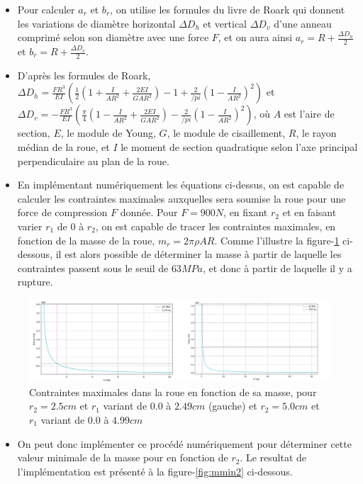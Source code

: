 \begin{itemize}
\begin{itemize}
    \item Pour calculer $a_r$ et $b_r$, on utilise les formules du livre de Roark qui donnent les variations de diamètre horizontal $\Delta D_h$ et vertical $\Delta D_v$ d'une anneau comprimé selon son diamètre avec une force $F$, et on aura ainsi $a_r=R+\frac{\Delta D_h}{2}$ et $b_r=R+\frac{\Delta D_v}{2}$.
    \item D'après les formules de Roark, $\Delta D_h=\frac{FR^3}{EI}(\frac{1}{2}(1+\frac{I}{AR^2}+\frac{2EI}{GAR^2})-1+\frac{2}{/pi}(1-\frac{I}{AR^2})^2)$ et $\Delta D_v=-\frac{FR^3}{EI}(\frac{\pi}{4}(1-\frac{I}{AR^2}+\frac{2EI}{GAR^2})-\frac{2}{/pi}(1-\frac{I}{AR^2})^2)$, où $A$ est l'aire de section, $E$, le module de Young, $G$, le module de cisaillement, $R$, le rayon médian de la roue, et $I$ le moment de section quadratique selon l'axe principal perpendiculaire au plan de la roue.
    \item En implémentant numériquement les équations ci-dessus, on est capable de calculer les contraintes maximales auxquelles sera soumise la roue pour une force de compression $F$ donnée. Pour $F=900N$, en fixant $r_2$ et en faisant varier $r_1$ de $0$ à $r_2$, on est capable de tracer les contraintes maximales, en fonction de la masse de la roue, $m_r=2\pi\rho A R$. Comme l'illustre la figure-\ref{fig:mmin1} ci-dessous, il est alors possible de déterminer la masse à partir de laquelle les contraintes passent sous le seuil de $63 MPa$, et donc à partir de laquelle il y a rupture.
    
\end{itemize}


\begin{figure}[htb]
\centering
\includegraphics[width=7in]{images_2ddl/mmin1.png}
\caption{Contraintes maximales dans la roue en fonction de sa masse, pour $r_2=2.5 cm$ et $r_1$ variant de $0.0$ à $2.49 cm$ (gauche) et $r_2=5.0 cm$ et $r_1$ variant de $0.0$ à $4.99 cm$}
\label{fig:mmin1}
\end{figure}


\begin{itemize}
    \item On peut donc implémenter ce procédé numériquement pour déterminer cette valeur minimale de la masse pour en fonction de $r_2$. Le resultat de l'implémentation est présenté à la figure-\ref{fig:mmin2} ci-dessous. 
\end{itemize}



\end{itemize}

